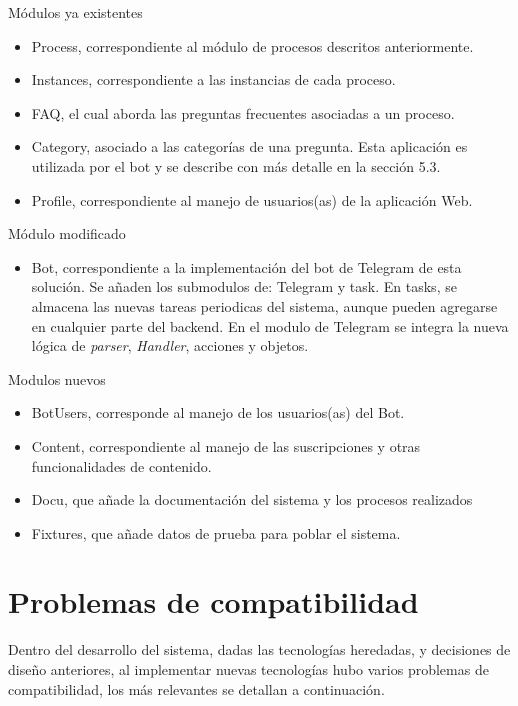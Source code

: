     Módulos ya existentes
    \begin{itemize}
        \item Process, correspondiente al módulo de procesos descritos anteriormente.
        \item Instances, correspondiente a las instancias de cada proceso.
        \item FAQ, el cual aborda las preguntas frecuentes asociadas a un proceso.
        \item Category, asociado a las categorías de una pregunta. Esta aplicación es utilizada por el bot y se describe con más detalle en la sección 5.3.
        \item Profile, correspondiente al manejo de usuarios(as) de la aplicación Web.  
    \end{itemize}

    Módulo modificado
    \begin{itemize}
        \item Bot, correspondiente a la implementación del bot de \gls{Telegram} de esta solución. Se añaden los submodulos de: \gls{Telegram} y task. En tasks, se almacena las nuevas tareas periodicas del sistema, aunque pueden agregarse en cualquier parte del backend. En el modulo de \gls{Telegram} se integra la nueva lógica de \textit{parser}, \textit{Handler}, acciones y objetos.
    \end{itemize}
    
    Modulos nuevos
    \begin{itemize}
        \item BotUsers, corresponde al manejo de los usuarios(as) del Bot.
        \item Content, correspondiente al manejo de las suscripciones y otras funcionalidades de contenido.
        \item Docu, que añade la documentación del sistema y los procesos realizados
        \item Fixtures, que añade datos de prueba para poblar el sistema.
    \end{itemize}

\section{Problemas de compatibilidad}
    \par Dentro del desarrollo del sistema, dadas las tecnologías heredadas, y decisiones de diseño anteriores, al implementar nuevas tecnologías hubo varios problemas de compatibilidad, los más relevantes se detallan a continuación.

